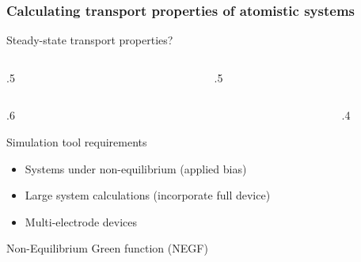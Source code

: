 \begin{framenologo}
  \frametitle{Calculating transport properties of atomistic systems}

  \begin{center}
    Steady-state transport properties?
  \end{center}

  \begin{columns}
    \begin{column}{.5\linewidth}
    \end{column}
    \begin{column}{.5\linewidth}
    \end{column}
  \end{columns}

  \begin{columns}
    \begin{column}{.6\linewidth}
      \begin{block}{Simulation tool requirements}
        \begin{itemize}
          \item Systems under non-equilibrium (applied bias)
          \item Large system calculations (incorporate full device)
          \item Multi-electrode devices
        \end{itemize}
      \end{block}

      \begin{center}
        Non-Equilibrium Green function (NEGF)
      \end{center}

    \end{column}
    \begin{column}{.4\linewidth}
      \begin{center}
      \end{center}
    \end{column}
  \end{columns}


\end{framenologo}


